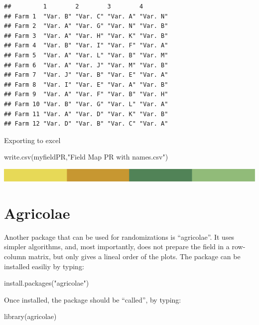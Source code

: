 \documentclass[
]{book}
\newenvironment{Shaded}{\begin{snugshade}}{\end{snugshade}}
\newcommand{\FunctionTok}[1]{\textcolor[rgb]{0.00,0.00,0.00}{#1}}
\newcommand{\NormalTok}[1]{#1}
\newcommand{\StringTok}[1]{\textcolor[rgb]{0.31,0.60,0.02}{#1}}
\begin{document}
\begin{verbatim}
##         1        2        3        4       
## Farm 1  "Var. B" "Var. C" "Var. A" "Var. N"
## Farm 2  "Var. A" "Var. G" "Var. N" "Var. B"
## Farm 3  "Var. A" "Var. H" "Var. K" "Var. B"
## Farm 4  "Var. B" "Var. I" "Var. F" "Var. A"
## Farm 5  "Var. A" "Var. L" "Var. B" "Var. M"
## Farm 6  "Var. A" "Var. J" "Var. M" "Var. B"
## Farm 7  "Var. J" "Var. B" "Var. E" "Var. A"
## Farm 8  "Var. I" "Var. E" "Var. A" "Var. B"
## Farm 9  "Var. A" "Var. F" "Var. B" "Var. H"
## Farm 10 "Var. B" "Var. G" "Var. L" "Var. A"
## Farm 11 "Var. A" "Var. D" "Var. K" "Var. B"
## Farm 12 "Var. D" "Var. B" "Var. C" "Var. A"
\end{verbatim}

Exporting to excel

\begin{Shaded}
\begin{Highlighting}[]
\FunctionTok{write.csv}\NormalTok{(myfieldPR,}\StringTok{"Field Map PR with names.csv"}\NormalTok{)}
\end{Highlighting}
\end{Shaded}

\includegraphics{rsrstrip.png}

\hypertarget{agricolae}{%
\section{Agricolae}\label{agricolae}}

Another package that can be used for randomizations is ``agricolae''. It uses simpler algorithms, and, most importantly, does not prepare the field in a row-column matrix, but only gives a lineal order of the plots. The package can be installed easiliy by typing:

\begin{Shaded}
\begin{Highlighting}[]
\FunctionTok{install.packages}\NormalTok{(}\StringTok{"agricolae"}\NormalTok{)}
\end{Highlighting}
\end{Shaded}

Once installed, the package should be ``called'', by typing:

\begin{Shaded}
\begin{Highlighting}[]
\FunctionTok{library}\NormalTok{(agricolae)}
\end{Highlighting}
\end{Shaded}
\end{document}
